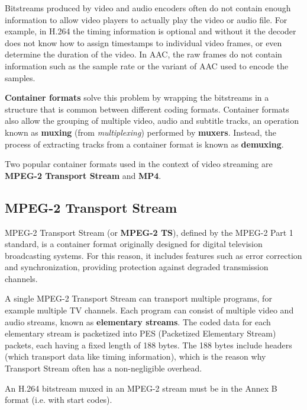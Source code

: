 Bitstreams produced by video and audio encoders often do not contain enough information to allow video players to actually play the video or audio file. For example, in H.264 the timing information is optional and without it the decoder does not know how to assign timestamps to individual video frames, or even determine the duration of the video.\cite{h264itu} In AAC, the raw frames do not contain information such as the sample rate or the variant of AAC used to encode the samples.\cite{aac}

\textbf{Container formats} solve this problem by wrapping the bitstreams in a structure that is common between different coding formats. Container formats also allow the grouping of multiple video, audio and subtitle tracks, an operation known as \textbf{muxing} (from \textit{multiplexing}) performed by \textbf{muxers}. Instead, the process of extracting tracks from a container format is known as \textbf{demuxing}.

Two popular container formats used in the context of video streaming are \textbf{MPEG-2 Transport Stream} and \textbf{MP4}.

\subsection{MPEG-2 Transport Stream}
\label{sec:bg/containers/mpeg2ts}

MPEG-2 Transport Stream (or \textbf{MPEG-2 TS}), defined by the MPEG-2 Part 1 standard, is a container format originally designed for digital television broadcasting systems. For this reason, it includes features such as error correction and synchronization, providing protection against degraded transmission channels.

A single MPEG-2 Transport Stream can transport multiple programs, for example multiple TV channels. Each program can consist of multiple video and audio streams, known as \textbf{elementary streams}. The coded data for each elementary stream is packetized into PES (Packetized Elementary Stream) packets, each having a fixed length of 188 bytes. The 188 bytes include headers (which transport data like timing information), which is the reason why Transport Stream often has a non-negligible overhead.\cite{mpeg2ts}


An H.264 bitstream muxed in an MPEG-2 stream must be in the Annex B format (i.e. with start codes).

